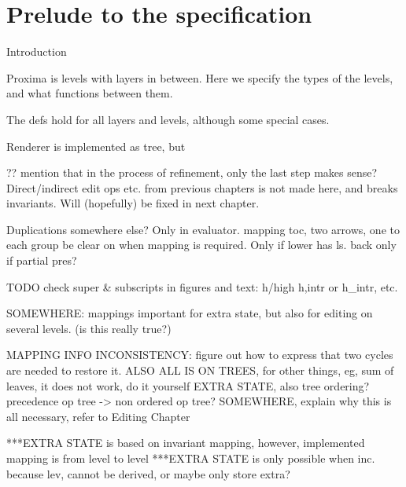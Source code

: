 \chapter{Prelude to the specification}
\label{chap:informalSpec}













\bc
Introduction

Proxima is levels with layers in between.
Here we specify the types of the levels, and what functions between them.

The defs hold for all layers and levels, although some special cases.

Renderer is implemented as tree, but
\ec




\bc

?? mention that in the process of refinement, only the last step makes sense? Direct/indirect edit ops etc. from previous chapters is not made here, and breaks invariants. Will (hopefully) be fixed in next chapter.


Duplications somewhere else? Only in evaluator.
mapping toc, two arrows, one to each group
be clear on when mapping is required. Only if lower has ls. back only if partial pres?



TODO
check super & subscripts in figures and text: h/high h,intr or h_intr, etc.

SOMEWHERE: mappings important for extra state, but also for editing on several levels. (is this really true?)

MAPPING INFO INCONSISTENCY: figure out how to express that two cycles are needed to restore it.
ALSO ALL IS ON TREES, for other things, eg, sum of leaves, it does not work, do it yourself
EXTRA STATE, also tree ordering? precedence op tree -> non ordered op tree?
SOMEWHERE, explain why this is all necessary, refer to Editing Chapter


***EXTRA STATE is based on invariant mapping, however, implemented mapping is from level to level
***EXTRA STATE is only possible when inc. because lev, cannot be derived, or maybe only store extra?

